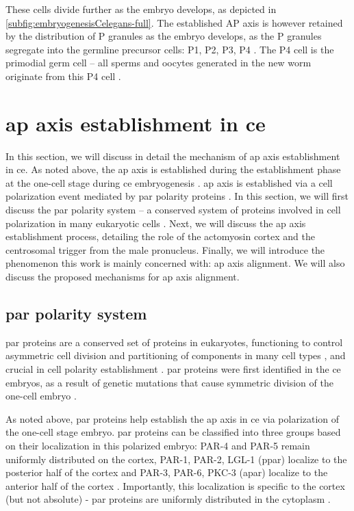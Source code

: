 These cells divide further as the embryo develops, as depicted in \autoref{subfig:embryogenesisCelegans-full}. The established AP axis is however retained by the distribution of P granules as the embryo develops, as the P granules segregate into the germline precursor cells: P1, P2, P3, P4 \citep{rose2014polarity,strome1989generation}. The P4 cell is the primodial germ cell -- all sperms and oocytes generated in the new worm originate from this P4 cell \citep{rose2014polarity,kimble2005germline}.

\section{\acs{ap} axis establishment in \acs{ce}}\label{sec:ApAxisEstablishment}
In this section, we will discuss in detail the mechanism of \ac{ap} axis establishment in \ac{ce}. As noted above, the \ac{ap} axis is established during the establishment phase at the one-cell stage during \ac{ce} embryogenesis \citep{rose2014polarity}. \ac{ap} axis is established via a cell polarization event mediated by \acs{par} polarity proteins \citep{motegi2013network,hoege2013principles,lang2017proteins}. In this section, we will first discuss the \acs{par} polarity system -- a conserved system of proteins involved in cell polarization in many eukaryotic cells \citep{hoege2013principles}. Next, we will discuss the \ac{ap} axis establishment process, detailing the role of the actomyosin cortex and the centrosomal trigger from the male pronucleus. Finally, we will introduce the phenomenon this work is mainly concerned with: \ac{ap} axis alignment. We will also discuss the proposed mechanisms for \ac{ap} axis alignment.

\subsection{\acs{par} polarity system}\label{subsec:ParPolarity}
\ac{par} proteins are a conserved set of proteins in eukaryotes, functioning to control asymmetric cell division and partitioning of components in many cell types \citep{goldstein2007proteins,knoblich2001asymmetric}, and crucial in cell polarity establishment \citep{goldstein2007proteins}. \ac{par} proteins were first identified in the \ac{ce} embryos, as a result of genetic mutations that cause symmetric division of the one-cell embryo \citep{guo1995par1,kemphues1988identification}. 

As noted above, \ac{par} proteins help establish the \ac{ap} axis in \ac{ce} via polarization of the one-cell stage embryo. \ac{par} proteins can be classified into three groups based on their localization in this polarized embryo: PAR-4 and PAR-5 remain uniformly distributed on the cortex, PAR-1, PAR-2, LGL-1 (\ac{ppar}) localize to the posterior half of the cortex and PAR-3, PAR-6, PKC-3 (\ac{apar}) localize to the anterior half of the cortex \citep{motegi2013network}. Importantly, this localization is specific to the cortex (but not absolute) - \ac{par} proteins are uniformly distributed in the cytoplasm \citep{motegi2013network,hoege2013principles}. 

